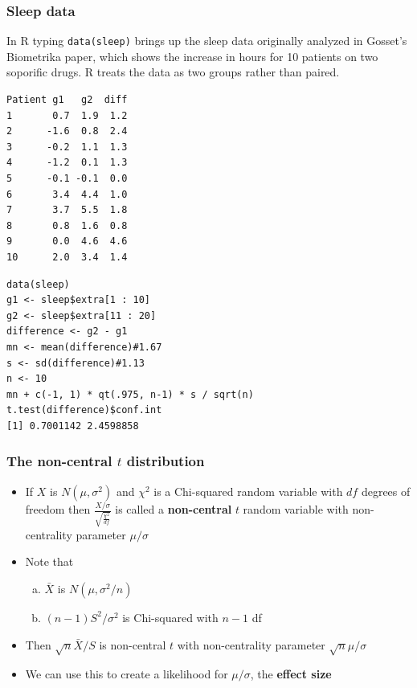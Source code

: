 \documentclass[aspectratio=169]{beamer}
\begin{document}
\begin{frame}\frametitle{Sleep data}
In R typing \texttt{data(sleep)} brings up the sleep data originally
analyzed in Gosset's Biometrika paper, which shows the increase in
hours for 10 patients on two soporific drugs. R treats the data as two
groups rather than paired.
\end{frame}

\begin{frame}[fragile]
\begin{verbatim}
Patient g1   g2  diff
1       0.7  1.9  1.2
2      -1.6  0.8  2.4
3      -0.2  1.1  1.3
4      -1.2  0.1  1.3
5      -0.1 -0.1  0.0
6       3.4  4.4  1.0
7       3.7  5.5  1.8
8       0.8  1.6  0.8
9       0.0  4.6  4.6
10      2.0  3.4  1.4
\end{verbatim}
\end{frame}

\begin{frame}[fragile]
\begin{verbatim}
data(sleep)
g1 <- sleep$extra[1 : 10]
g2 <- sleep$extra[11 : 20]
difference <- g2 - g1
mn <- mean(difference)#1.67
s <- sd(difference)#1.13
n <- 10
mn + c(-1, 1) * qt(.975, n-1) * s / sqrt(n)
t.test(difference)$conf.int
[1] 0.7001142 2.4598858
\end{verbatim}
\end{frame}

\begin{frame}\frametitle{The non-central $t$ distribution}
\begin{itemize}
\item If $X$ is $N(\mu,\sigma^2)$ and $\chi^2$ is a Chi-squared random
  variable with $df$ degrees of freedom then
  $\frac{X/\sigma}{\sqrt{\frac{\chi^2}{df}}}$ is called a {\bf
    non-central} $t$ random variable with non-centrality parameter
  $\mu/\sigma$
\item Note that
  \begin{enumerate}[a.]
  \item $\bar X$ is $N(\mu, \sigma^2/n)$
  \item $(n-1)S^2/\sigma^2$ is Chi-squared with $n-1$ df 
  \end{enumerate}
\item Then $\sqrt{n}\bar X / S$ is non-central $t$ with non-centrality
  parameter $\sqrt{n}\mu/\sigma$
\item We can use this to create a likelihood for $\mu/\sigma$, the {\bf effect size}
\end{itemize}
\end{frame}
\end{document}
